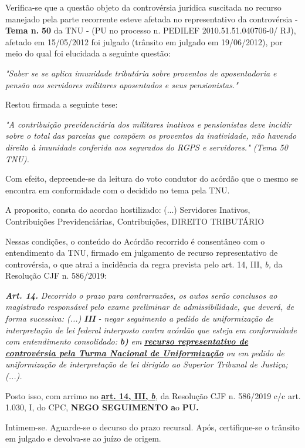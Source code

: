 \documentclass[12pt]{article}
\begin{document}
\justifying
\noindent Verifica-se que a questão objeto da controvérsia jurídica suscitada no recurso manejado pela parte recorrente esteve afetada no representativo da controvérsia - \textbf{Tema n. }\textbf{50} da TNU - (PU no processo n. PEDILEF 2010.51.51.040706-0/ RJ),  afetado em 15/05/2012 foi julgado (trânsito em julgado em 19/06/2012), por meio do qual foi elucidada a seguinte questão:

\noindent \textit{"Saber se se aplica imunidade tributária sobre proventos de aposentadoria e pensão aos servidores militares aposentados e seus pensionistas."}

\noindent Restou firmada a seguinte tese:

\noindent \textit{"A contribuição previdenciária dos militares inativos e pensionistas deve incidir sobre o total das parcelas que compõem os proventos da inatividade, não havendo direito à imunidade conferida aos segurados do RGPS e servidores." (Tema 50 TNU).}

\noindent Com efeito, depreende-se da leitura do voto condutor do acórdão que o mesmo se encontra em conformidade com o decidido no  tema pela TNU.

\noindent A proposito, consta do acordao hostilizado: (...) Servidores Inativos, Contribuições Previdenciárias, Contribuições, DIREITO TRIBUTÁRIO

\noindent Nessas condições, o conteúdo do Acórdão recorrido é consentâneo com o entendimento da TNU, firmado em julgamento de recurso representativo de controvérsia, o que atrai a incidência da regra prevista pelo art. 14, III, \textit{b,} da Resolução CJF n. 586/2019:

\noindent \textit{\textbf{Art. 14.}}\textit{ Decorrido o prazo para contrarrazões, os autos serão conclusos ao magistrado responsável pelo exame preliminar de admissibilidade, que deverá, de forma sucessiva: (...) }\textit{\textbf{III }}\textit{- negar seguimento a pedido de uniformização de interpretação de lei federal interposto contra acórdão que esteja em conformidade com entendimento consolidado: }\textit{\textbf{b)}}\textit{ em }\uline{\textit{\textbf{recurso representativo de controvérsia pela Turma Nacional de Uniformização}}}\textit{ ou em pedido de uniformização de interpretação de lei dirigido ao Superior Tribunal de Justiça;(...).}

\noindent Posto isso, com arrimo no \uline{\textbf{art. 14, III, }}\uline{\textit{\textbf{b}}}\textit{,} da Resolução CJF n. 586/2019 c/c art. 1.030, I, do CPC, \textbf{NEGO SEGUIMENTO }\textbf{a}o\textbf{ PU}\textbf{.}

\noindent Intimem-se. Aguarde-se o decurso do prazo recursal. Após, certifique-se o trânsito em julgado e devolva-se ao juízo de origem.
\end{document}

